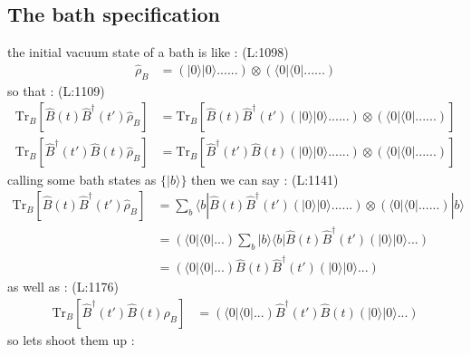 \subsection{The bath specification}
 the initial vacuum state of a bath is like :
(L:1098)
\begin{equation}
\begin{split}
\hat{\rho }_{B }&=\left(|0\rangle |0\rangle ......\right)\otimes \left(\langle 0|\langle 0|......\right)\end{split}
\end{equation}
 so that : 
(L:1109)
\begin{equation}
\begin{split}
\text{Tr}_{B }\left[\hat{B }(t )\hat{B }^\dagger (t ')\hat{\rho }_{B }\right]&=\text{Tr}_{B }\left[\hat{B }(t )\hat{B }^\dagger (t ')\left(|0\rangle |0\rangle ......\right)\otimes \left(\langle 0|\langle 0|......\right)\right]\\
\text{Tr}_{B }\left[\hat{B }^\dagger (t ')\hat{B }(t )\hat{\rho }_{B }\right]&=\text{Tr}_{B }\left[\hat{B }^\dagger (t ')\hat{B }(t )\left(|0\rangle |0\rangle ......\right)\otimes \left(\langle 0|\langle 0|......\right)\right]\end{split}
\end{equation}
 calling some bath states as 
 $ \{|b \rangle \} $  then we can say : 
(L:1141)
\begin{equation}
\begin{split}
\text{Tr}_{B }\left[\hat{B }(t )\hat{B }^\dagger (t ')\hat{\rho }_{B }\right]&=\sum _{b }\langle b |\hat{B }(t )\hat{B }^\dagger (t ')\left(|0\rangle |0\rangle ......\right)\otimes \left(\langle 0|\langle 0|......\right)|b \rangle \\
&=\left(\langle 0|\langle 0|...\right)\sum _{b }|b \rangle \langle b |\hat{B }(t )\hat{B }^\dagger (t ')\left(|0\rangle |0\rangle ...\right)\\
&=\left(\langle 0|\langle 0|...\right)\hat{B }(t )\hat{B }^\dagger (t ')\left(|0\rangle |0\rangle ...\right)\end{split}
\end{equation}
 as well as : 
(L:1176)
\begin{equation}
\begin{split}
\text{Tr}_{B }\left[\hat{B }^\dagger (t ')\hat{B }(t )\hat{\rho }_{B }\right]&=\left(\langle 0|\langle 0|...\right)\hat{B }^\dagger (t ')\hat{B }(t )\left(|0\rangle |0\rangle ...\right)\end{split}
\end{equation}
 so lets shoot them up : 
